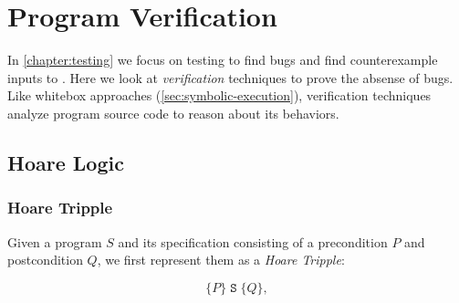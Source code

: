 \documentclass[oneside,11pt,dvipsnames]{book}
\newcommand{\code}[1]{\texttt{#1}}
\begin{document}



\chapter{Program Verification}\label{chapter:verification}

In \autoref{chapter:testing} we focus on testing to find bugs and find counterexample inputs to . Here we look at \emph{verification} techniques to prove the absense of bugs. Like whitebox approaches (\autoref{sec:symbolic-execution}), verification techniques analyze program source code to reason about its behaviors. 


\section{Hoare Logic}\label{sec:hoare-logic}
\subsection{Hoare Tripple}

Given a program $S$ and its specification consisting of a precondition $P$ and postcondition $Q$, we first represent them as a \emph{Hoare Tripple}:

\begin{center}
\begin{tcolorbox}[colframe=green!50!black, colback=gray!5!white, boxrule=0.5mm, width=0.5\textwidth, sharp corners]
    \[
    \{ P \} \; \code{S} \; \{ Q \}, 
    \]
\end{tcolorbox}
\end{center}
\end{document}
